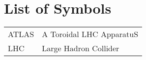 \chapter*{List of Symbols}
  \begin{tabular}{lp{}}
    ATLAS \dotfill & A Toroidal LHC ApparatuS \\
    LHC \dotfill   & Large Hadron Collider \\
  \end{tabular}
